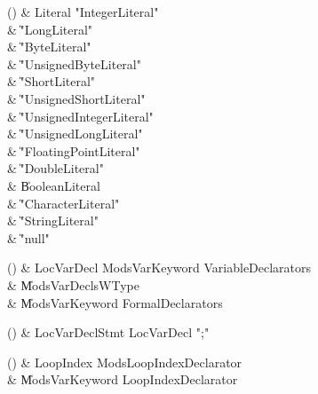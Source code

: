\begin{bbgrammarappendix}

() & Literal \label{prod:Literal}  \: \xcd"IntegerLiteral"   \\

 &    \| \xcd"LongLiteral"  \\
 &    \| \xcd"ByteLiteral" \\
 &    \| \xcd"UnsignedByteLiteral" \\
 &    \| \xcd"ShortLiteral" \\
 &    \| \xcd"UnsignedShortLiteral" \\
 &    \| \xcd"UnsignedIntegerLiteral"  \\
 &    \| \xcd"UnsignedLongLiteral"  \\
 &    \| \xcd"FloatingPointLiteral"  \\
 &    \| \xcd"DoubleLiteral"  \\
 &    \| BooleanLiteral \\
 &    \| \xcd"CharacterLiteral"  \\
 &    \| \xcd"StringLiteral"  \\
 &    \| \xcd"null" \\

\end{bbgrammarappendix}

\begin{bbgrammarappendix}

() & LocVarDecl \label{prod:LocVarDecl}  \: Mods\opt VarKeyword VariableDeclarators  \\

 &    \| Mods\opt VarDeclsWType \\
 &    \| Mods\opt VarKeyword FormalDeclarators \\

\end{bbgrammarappendix}

\begin{bbgrammarappendix}

() & LocVarDeclStmt \label{prod:LocVarDeclStmt}  \: LocVarDecl \xcd";"  \\


\end{bbgrammarappendix}

\begin{bbgrammarappendix}

() & LoopIndex \label{prod:LoopIndex}  \: Mods\opt LoopIndexDeclarator  \\

 &    \| Mods\opt VarKeyword LoopIndexDeclarator \\

\end{bbgrammarappendix}

